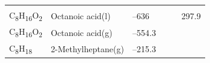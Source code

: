\documentclass[
  9pt,
]{extbook}
\theoremstyle{definition}
\theoremstyle{definition}
\theoremstyle{definition}
\theoremstyle{remark}
\begin{document}
\begin{longtable}[]{@{}llllll@{}}
\begin{minipage}[t]{0.14\columnwidth}
\strut
\end{minipage}\tabularnewline
\begin{minipage}[t]{0.07\columnwidth}\raggedright
C\textsubscript{8}H\textsubscript{16}O\textsubscript{2}\strut
\end{minipage} & \begin{minipage}[t]{0.17\columnwidth}\raggedright
Octanoic acid(l)\strut
\end{minipage} & \begin{minipage}[t]{0.15\columnwidth}\raggedright
--636\strut
\end{minipage} & \begin{minipage}[t]{0.15\columnwidth}\raggedright
\strut
\end{minipage} & \begin{minipage}[t]{0.14\columnwidth}\raggedright
\strut
\end{minipage} & \begin{minipage}[t]{0.14\columnwidth}\raggedright
297.9\strut
\end{minipage}\tabularnewline
\begin{minipage}[t]{0.07\columnwidth}\raggedright
C\textsubscript{8}H\textsubscript{16}O\textsubscript{2}\strut
\end{minipage} & \begin{minipage}[t]{0.17\columnwidth}\raggedright
Octanoic acid(g)\strut
\end{minipage} & \begin{minipage}[t]{0.15\columnwidth}\raggedright
--554.3\strut
\end{minipage} & \begin{minipage}[t]{0.15\columnwidth}\raggedright
\strut
\end{minipage} & \begin{minipage}[t]{0.14\columnwidth}\raggedright
\strut
\end{minipage} & \begin{minipage}[t]{0.14\columnwidth}\raggedright
\strut
\end{minipage}\tabularnewline
\begin{minipage}[t]{0.07\columnwidth}\raggedright
C\textsubscript{8}H\textsubscript{18}\strut
\end{minipage} & \begin{minipage}[t]{0.17\columnwidth}\raggedright
2-Methylheptane(g)\strut
\end{minipage} & \begin{minipage}[t]{0.15\columnwidth}\raggedright
--215.3\strut
\end{minipage} & \begin{minipage}[t]{0.15\columnwidth}\raggedright

\end{minipage}
\end{longtable}
\end{document}
